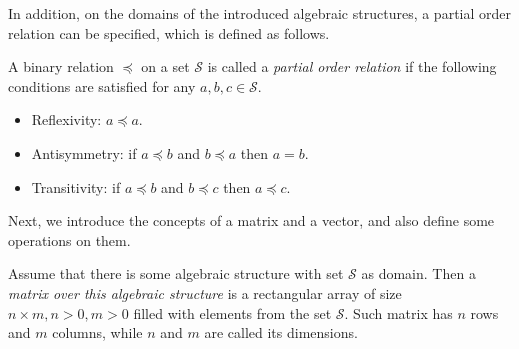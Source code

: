 In addition, on the domains of the introduced algebraic structures, a partial order relation can be specified, which is defined as follows.

\begin{definition}
A binary relation $\preceq$ on a set $\mathcal{S}$ is called a \textit{partial order relation} if the following conditions are satisfied for any $a, b, c \in \mathcal{S}$.
\begin{itemize}
	\item Reflexivity: $a \preceq a$.
    \item Antisymmetry: if $a \preceq b$ and $b \preceq a$ then $a = b$. 
    \item Transitivity: if $a \preceq b$ and $b \preceq c$ then $a \preceq c$. 
\end{itemize}
\end{definition}

Next, we introduce the concepts of a matrix and a vector, and also define some operations on them.

\begin{definition}[A matrix]
Assume that there is some algebraic structure with set $\mathcal{S}$ as domain. Then a \emph{matrix over this algebraic structure} is a rectangular array of size $n\times m, n > 0, m > 0$ filled with elements from the set $\mathcal{S}$. Such matrix has $n$ rows and $m$ columns, while $n$ and $m$ are called its dimensions.
\end{definition}

